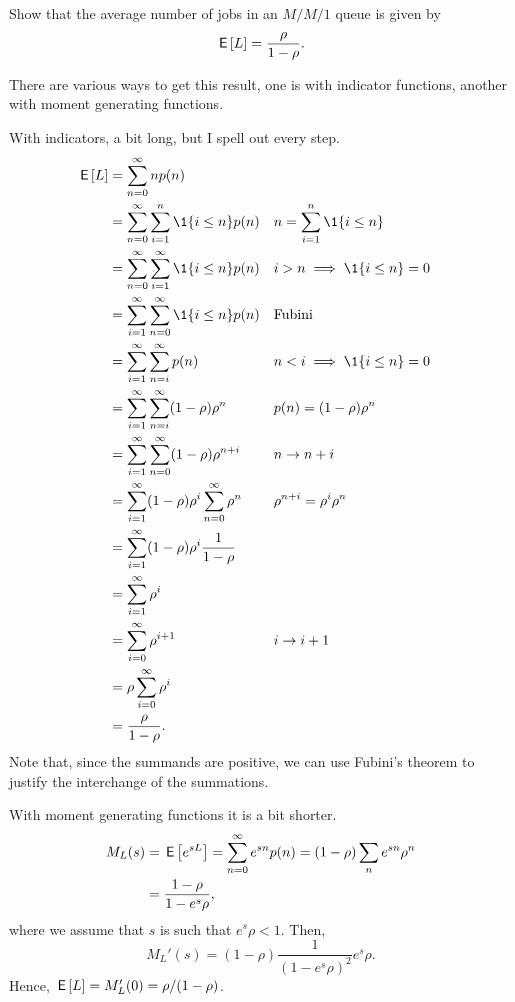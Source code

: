 \begin{exercise}\label{ex:12}
Show that the average number of jobs in an  $M/M/1$ queue is given by
\begin{equation}\label{eq:el}
  \,\mathsf{E}\left[L\right] = \frac \rho{1-\rho}.
\end{equation}
\begin{hint}
There are various ways to get this result, one is with indicator functions, another with moment generating functions.   
\end{hint}
  \begin{solution}
With indicators, a bit long, but I spell out every step.
\begin{align*}
\E L &= \sum_{n=0}^\infty n p(n) \\
&= \sum_{n=0}^\infty \sum_{i=1}^n \1{i\leq n} p(n)  && n=\sum_{i=1}^n \1{i\leq n}\\
&= \sum_{n=0}^\infty \sum_{i=1}^\infty   \1{i\leq n} p(n)  && i>n\implies \1{i\leq n} = 0\\
&= \sum_{i=1}^\infty \sum_{n=0}^\infty  \1{i\leq n} p(n) &&\text{Fubini} \\
&= \sum_{i=1}^\infty \sum_{n=i}^\infty p(n) && n < i \implies \1{i\leq n}=0 \\
&= \sum_{i=1}^\infty \sum_{n=i}^\infty (1-\rho)\rho^n && p(n) = (1-\rho)\rho^n \\
&= \sum_{i=1}^\infty \sum_{n=0}^\infty (1-\rho)\rho^{n+i} && n\to n+i \\
&= \sum_{i=1}^\infty (1-\rho)\rho^i \sum_{n=0}^\infty \rho^n && \rho^{n+i}=\rho^i \rho^n\\
&= \sum_{i=1}^\infty (1-\rho)\rho^i \frac1{1-\rho}   \\
&= \sum_{i=1}^\infty \rho^i \\
&= \sum_{i=0}^\infty \rho^{i+1} && i\to i+1\\
&= \rho \sum_{i=0}^\infty \rho^i \\
&= \frac{\rho}{1-\rho}.
\end{align*}
Note that, since the summands are positive, we can use Fubini's theorem
to justify the interchange of the summations.

With moment generating functions it is a bit shorter. 
\begin{equation*}
  \begin{split}
  M_L(s) 
&= \,\mathsf{E}\left[e^{s L}\right] = \sum_{n=0}^\infty e^{s n}p(n) = (1-\rho) \sum_n e^{s n} \rho^n \\
&=\frac{1-\rho}{1-e^{s}\rho},
  \end{split}
\end{equation*}
where we assume that $s$ is such that $e^s \rho < 1$. Then, 
\begin{equation*}
  M_L'(s) = (1-\rho) \frac{1}{(1-e^s\rho)^2} e^s \rho.
\end{equation*}
Hence, $\,\mathsf{E}\left[L\right] = M_L'(0) = \rho/(1-\rho)$.
  \end{solution}
\end{exercise}


